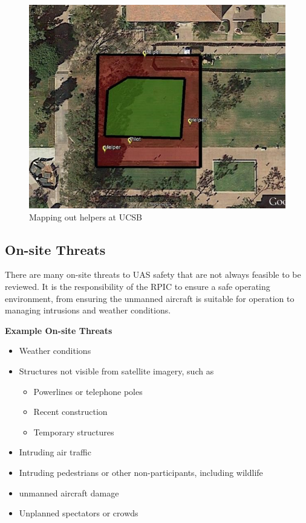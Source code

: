 \documentclass[
]{book}
\providecommand{\tightlist}{%
  \setlength{\itemsep}{0pt}\setlength{\parskip}{0pt}}
\begin{document}
\begin{figure}

{\centering \includegraphics[width=1\linewidth]{images/Mission_Planning_UCSB} 

}

\caption{Mapping out helpers at UCSB}\label{fig:MP-UCSB}
\end{figure}

\subsection{On-site Threats}\label{on-site-threats}

There are many on-site threats to UAS safety that are not always feasible to be reviewed. It is the responsibility of the RPIC to ensure a safe operating environment, from ensuring the unmanned aircraft is suitable for operation to managing intrusions and weather conditions.

\textbf{Example On-site Threats}

\begin{itemize}
\item
  Weather conditions
\item
  Structures not visible from satellite imagery, such as

  \begin{itemize}
  \tightlist
  \item
    Powerlines or telephone poles
  \item
    Recent construction
  \item
    Temporary structures
  \end{itemize}
\item
  Intruding air traffic
\item
  Intruding pedestrians or other non-participants, including wildlife
\item
  unmanned aircraft damage
\item
  Unplanned spectators or crowds
\end{itemize}
\end{document}

